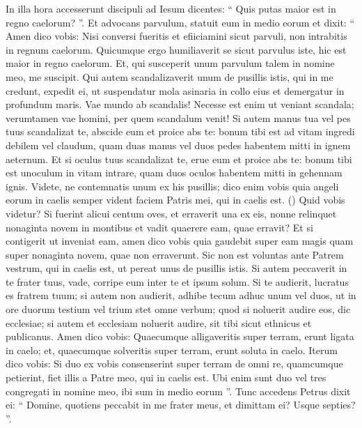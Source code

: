 \begin{biblechapter}
\begin{biblechapter}
\begin{biblechapter}
\begin{biblechapter}
\begin{biblechapter}
\begin{biblechapter}
\begin{biblechapter}
\begin{biblechapter}
\begin{biblechapter}
\begin{biblechapter}
\begin{biblechapter}
\begin{biblechapter}
\begin{biblechapter}
\begin{biblechapter}
\begin{biblechapter}
\begin{biblechapter}
\begin{biblechapter}
\begin{biblechapter}
\verse In illa hora accesserunt discipuli ad Iesum dicentes: “ Quis putas maior est in regno caelorum? ”. 
\verse Et advocans parvulum, statuit eum in medio eorum 
 \verse et dixit: “ Amen dico vobis: Nisi conversi fueritis et efiiciamini sicut parvuli, non intrabitis in regnum caelorum. 
\verse Quicumque ergo humiliaverit se sicut parvulus iste, hic est maior in regno caelorum. 
\verse Et, qui susceperit unum parvulum talem in nomine meo, me suscipit.
 \verse Qui autem scandalizaverit unum de pusillis istis, qui in me credunt, expedit ei, ut suspendatur mola asinaria in collo eius et demergatur in profundum maris. 
\verse Vae mundo ab scandalis! Necesse est enim ut veniant scandala; verumtamen vae homini, per quem scandalum venit!
 \verse Si autem manus tua vel pes tuus scandalizat te, abscide eum et proice abs te: bonum tibi est ad vitam ingredi debilem vel claudum, quam duas manus vel duos pedes habentem mitti in ignem aeternum. 
\verse Et si oculus tuus scandalizat te, erue eum et proice abs te: bonum tibi est unoculum in vitam intrare, quam duos oculos habentem mitti in gehennam ignis.
 \verse Videte, ne contemnatis unum ex his pusillis; dico enim vobis quia angeli eorum in caelis semper
 vident faciem Patris mei, qui in caelis est. 
(\verse) \verse Quid vobis videtur? Si fuerint alicui centum oves, et erraverit una ex eis, nonne relinquet nonaginta novem in montibus et vadit quaerere eam, quae erravit? 
\verse Et si contigerit ut inveniat eam, amen dico vobis quia gaudebit super eam magis quam super nonaginta novem, quae non erraverunt. 
\verse Sic non est voluntas ante Patrem vestrum, qui in caelis est, ut pereat unus de pusillis istis.
 \verse Si autem peccaverit in te frater tuus, vade, corripe eum inter te et ipsum solum. Si te audierit, lucratus es fratrem tuum; 
\verse si autem non audierit, adhibe tecum adhuc unum vel duos, ut in ore duorum testium vel trium stet omne verbum; 
\verse quod si noluerit audire eos, dic ecclesiae; si autem et ecclesiam noluerit audire, sit tibi sicut ethnicus et publicanus. 
\verse Amen dico vobis: Quaecumque alligaveritis super terram, erunt ligata in caelo; et, quaecumque solveritis super terram, erunt soluta in caelo.
 \verse Iterum dico vobis: Si duo ex vobis consenserint super terram de omni re, quamcumque petierint, fiet illis a Patre meo, qui in caelis est. 
\verse Ubi enim sunt duo vel tres congregati in nomine meo, ibi sum in medio eorum ”.
 \verse Tunc accedens Petrus dixit ei: “ Domine, quotiens peccabit in me frater meus, et dimittam ei? Usque septies? ”. 

\end{biblechapter}
\end{biblechapter}
\end{biblechapter}
\end{biblechapter}
\end{biblechapter}
\end{biblechapter}
\end{biblechapter}
\end{biblechapter}
\end{biblechapter}
\end{biblechapter}
\end{biblechapter}
\end{biblechapter}
\end{biblechapter}
\end{biblechapter}
\end{biblechapter}
\end{biblechapter}
\end{biblechapter}
\end{biblechapter}
